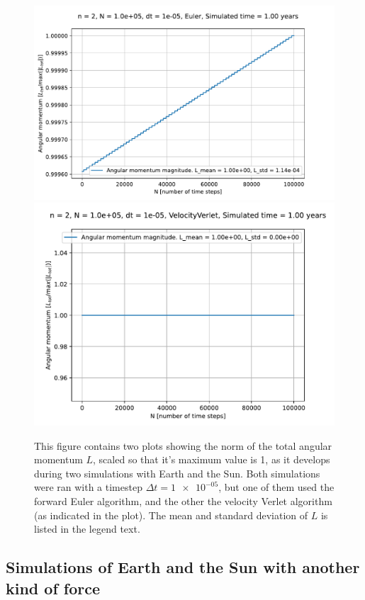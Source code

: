 \documentclass[reprint,english,notitlepage]{revtex4-1}  %
\begin{document}
\begin{figure}[H]
\includegraphics[scale=0.5]{../data/figures/sun-earth-3c/se_dt1e-5_fe_angmom.pdf}
\includegraphics[scale=0.5]{../data/figures/sun-earth-3c/se_dt1e-5_vv_angmom.pdf}
\caption{This figure contains two plots showing the norm of the total angular momentum $L$, scaled so that it's maximum value is 1, as it develops during two simulations with Earth and the Sun. Both simulations were ran with a timestep $\Delta t = \num{1e-05}$, but one of them used the forward Euler algorithm, and the other the velocity Verlet algorithm (as indicated in the plot). The mean and standard deviation of $L$ is listed in the legend text.   }
\label{fig:se-3c-angmom}
\end{figure}


\subsection{Simulations of Earth and the Sun with another kind of force} \label{sec:IV:c}
\end{document}
